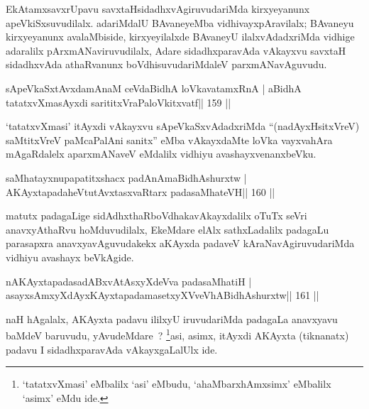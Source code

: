 \begin{artha}
EkAtamxsavxrUpavu savxtaHsidadhxvAgiruvudariMda kirxyeyanunx apeVkiSxsuvudilalx. adariMdalU BAvaneyeMba vidhivayxpAravilalx; BAvaneyu kirxyeyanunx avalaMbiside, kirxyeyilalxde BAvaneyU ilalxvAdadxriMda vidhige adaralilx pArxmANaviruvudilalx, Adare sidadhxparavAda vAkayxvu savxtaH sidadhxvAda athaRvanunx boVdhisuvudariMdaleV parxmANavAguvudu.
\end{artha}


\begin{shl}
sApeVkaSxtAvxdamAnaM ceVdaBidhA loVkavatamxRnA |
aBidhA tatatxvXmasAyxdi sarititxVraPaloVkitxvatf\hfill || 159 ||
\end{shl}

\begin{artha}
`tatatxvXmasi' itAyxdi vAkayxvu sApeVkaSxvAdadxriMda ``(nadAyxHsitxVreV) saMtitxVreV paMcaPalAni sanitx'' eMba vAkayxdaMte loVka vayxvahAra mAgaRdalelx aparxmANaveV eMdalilx vidhiyu avashayxvenanxbeVku.
\end{artha}

\begin{shl}
saMhatayxnupapatitxshacx padAnAmaBidhAshurxtw |
AKAyxtapadaheVtutAvxtasxvaRtarx padasaMhateVH\hfill || 160 ||
\end{shl}

\begin{artha}
matutx padagaLige sidAdhxthaRboVdhakavAkayxdalilx oTuTx seVri anavxyAthaRvu hoMduvudilalx, EkeMdare elAlx sathxLadalilx padagaLu parasapxra anavxyavAguvudakekx aKAyxda padaveV kAraNavAgiruvudariMda vidhiyu avashayx beVkAgide.
\end{artha}


\begin{shl}
nA\s\s KAyxtapadasadABxvAtAsxyXdeVva padasaMhatiH |
asayxsAmxyXdAyxKAyxtapadamasetxyXVveVhABidhAshurxtw\hfill || 161 ||
\end{shl}

\begin{artha}
naH hAgalalx, AKAyxta padavu ililxyU iruvudariMda padagaLa anavxyavu baMdeV baruvudu, yAvudeMdare~? \footnote{`tatatxvXmasi' eMbalilx `asi' eMbudu, `ahaMbarxhAmxsimx' eMbalilx `asimx' eMdu ide.}asi, asimx, itAyxdi AKAyxta (tiknanatx) padavu I sidadhxparavAda vAkayxgaLalUlx ide.
\end{artha}


